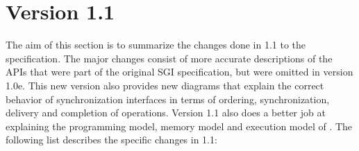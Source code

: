 \section{Version 1.1}
The aim of this section is to summarize the changes done in 1.1 to the \openshmem specification. 
The major changes consist of more accurate descriptions of the \openshmem \acp{API} that 
were part of the original SGI specification, but were omitted in version 1.0e. This new version also provides new
diagrams that explain the correct behavior of \openshmem synchronization interfaces in terms of ordering, synchronization, delivery and
completion of operations. Version 1.1 also does a better job at explaining the programming model, memory model and execution model  
of \openshmem. The following list describes the specific changes in 1.1:%

